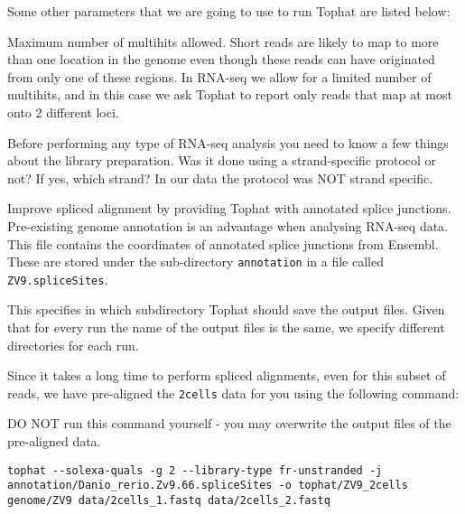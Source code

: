 \begin{note}
Some other parameters that we are going to use to run Tophat are listed below:
\begin{description}[style=multiline,labelindent=0cm,align=right,leftmargin=\descriptionlabelspace,rightmargin=1.5cm,font=\ttfamily]
 \item[-g] Maximum number of multihits allowed. Short reads are likely to map to
 more than one location in the genome even though these reads can have originated
 from only one of these regions. In RNA-seq we allow for a limited number of
 multihits, and in this case we ask Tophat to report only reads that map at most
 onto 2 different loci.
 \item[--library-type] Before performing any type of RNA-seq analysis you need
 to know a few things about the library preparation. Was it done using a
 strand-specific protocol or not? If yes, which strand? In our data the protocol
 was NOT strand specific.
 \item[-j] Improve spliced alignment by providing Tophat with annotated splice
 junctions. Pre-existing genome annotation is an advantage when analysing RNA-seq
 data. This file contains the coordinates of annotated splice junctions from Ensembl.
 These are stored under the sub-directory \texttt{annotation} in a file called
 \texttt{ZV9.spliceSites}.
 \item[-o] This specifies in which subdirectory Tophat should save the output
 files. Given that for every run the name of the output files is the same, we
 specify different directories for each run.
\end{description}
\end{note}

Since it takes a long time to perform spliced alignments, even for this subset of
reads, we have pre-aligned the \texttt{2cells} data for you using the following command:
\begin{warning}
  DO NOT run this command yourself - you may overwrite the output files of the
  pre-aligned data.
\end{warning}

\begin{lstlisting}
tophat --solexa-quals -g 2 --library-type fr-unstranded -j annotation/Danio_rerio.Zv9.66.spliceSites -o tophat/ZV9_2cells genome/ZV9 data/2cells_1.fastq data/2cells_2.fastq
\end{lstlisting}


